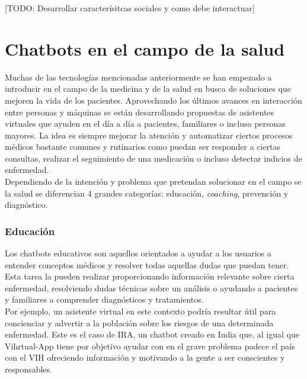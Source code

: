 [TODO: Desarrollar caracterísitcas sociales y como debe interactuar]

\section{Chatbots en el campo de la salud}
Muchas de las tecnologías mencionadas anteriormente se han empezado a introducir en el campo de la medicina y de la salud en busca de soluciones que mejoren la vida de los pacientes. Aprovechando los últimos avances en interacción entre personas y máquinas  se están desarrollando propuestas de asistentes virtuales que ayuden en el día a día a pacientes, familiares o incluso personas mayores. La idea es siempre mejorar la atención y automatizar ciertos procesos médicos \cite{healthAgents} bastante comunes y rutinarios como puedan ser responder a ciertas consultas, realizar el seguimiento de una medicación o incluso detectar indicios de enfermedad. \\

Dependiendo de la intención y problema que pretendan solucionar en el campo se la salud se diferencian 4 grandes categorías: educación, \textit{coaching}, prevención y diagnóstico.\\

\subsubsection{Educación}
Los chatbots educativos son aquellos orientados a ayudar a los usuarios a entender conceptos médicos y resolver todas aquellas dudas que puedan tener. Esta tarea la pueden realizar proporcionando información relevante sobre cierta enfermedad, resolviendo dudas técnicas sobre un análisis o ayudando a pacientes y familiares a comprender diagnósticos y tratamientos. \\

Por ejemplo, un asistente virtual en este contexto podría resultar útil para  concienciar y advertir a la población sobre los riesgos de una determinada enfermedad. Este es el caso de IRA, un chatbot creado en India que, al igual que Vihrtual-App tiene por objetivo ayudar con en el grave problema padece el país con el VIH ofreciendo información y motivando a la gente a ser conscientes y responsables.\\

